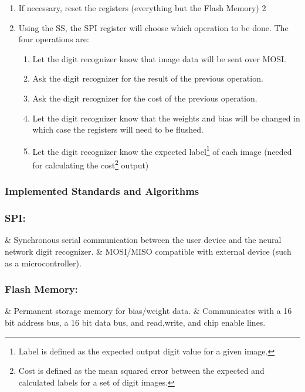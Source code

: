 \documentclass[12pt]{article}
\begin{document}
\begin{enumerate}
    \item If necessary, reset the registers (everything but the Flash Memory)
   2\item Using the SS, the SPI register will choose which operation to be done. The four operations are:
        \begin{enumerate}
            \item Let the digit recognizer know that image data will be sent over MOSI.
            \item Ask the digit recognizer for the result of the previous operation.
            \item Ask the digit recognizer for the cost of the previous operation.
            \item Let the digit recognizer know that the weights and bias will be changed in which case the registers will need to be flushed.
            \item Let the digit recognizer know the expected label\footnote{Label is defined as the expected output digit value for a given image.} of each image (needed for calculating the cost\footnote{Cost is defined as the mean squared error between the expected and calculated labels for a set of digit images.} output)
        \end{enumerate}
\end{enumerate}
\newpage

\subsubsection{Implemented Standards and Algorithms\label{sec:standards}}

\subsubsection*{SPI:}

\begin{easylist}[itemize]
& Synchronous serial communication between the user device and the neural network digit recognizer.
& MOSI/MISO compatible with external device (such as a microcontroller).
\end{easylist}



\subsubsection*{Flash Memory:}

\begin{easylist}
& Permanent storage memory for bias/weight data.
& Communicates with a 16 bit address bus, a 16 bit data bus, and read,write, and chip enable lines.
\end{easylist}
\end{document}
